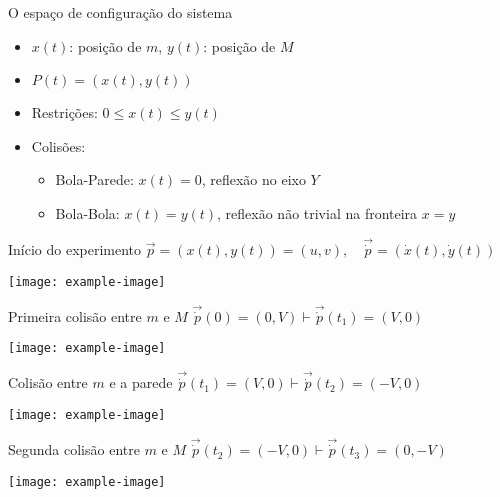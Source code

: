 \documentclass{beamer}
\begin{document}
\begin{frame}{O espaço de configuração do sistema}
\begin{itemize}
  \item $x(t)$: posição de $m$, $y(t)$: posição de $M$
  \item $P(t) = (x(t), y(t))$
  \item Restrições: $0 \leq x(t) \leq y(t)$
  \item Colisões:
    \begin{itemize}
      \item Bola-Parede: $x(t) = 0$, reflexão no eixo $Y$
      \item Bola-Bola: $x(t) = y(t)$, reflexão não trivial na fronteira $x = y$
    \end{itemize}
\end{itemize}
\end{frame}

\begin{frame}{Início do experimento}
$\vec{p} = (x(t),y(t)) = (u,v), \quad \vec{\dot p} = (\dot x(t),\dot y(t))$
\vspace{1em}

\texttt{[image: example-image]}
\end{frame}

\begin{frame}{Primeira colisão entre $m$ e $M$}
$\vec{\dot p}(0) = (0,V) \vdash \vec{\dot p}(t_1) = (V,0)$

\texttt{[image: example-image]}
\end{frame}

\begin{frame}{Colisão entre $m$ e a parede}
$\vec{\dot p}(t_1) = (V,0) \vdash \vec{\dot p}(t_2) = (-V,0)$

\texttt{[image: example-image]}
\end{frame}

\begin{frame}{Segunda colisão entre $m$ e $M$}
$\vec{\dot p}(t_2) = (-V,0) \vdash \vec{\dot p}(t_3) = (0,-V)$

\texttt{[image: example-image]}
\end{frame}
\end{document}
